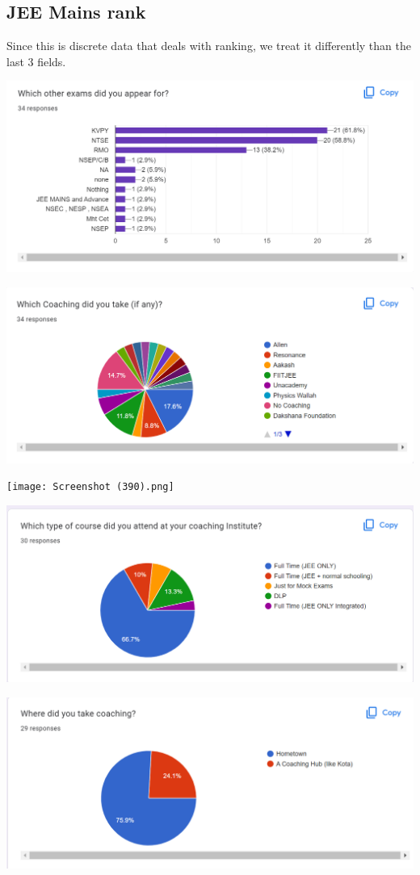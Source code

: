 \documentclass[
  letterpaper,
  DIV=11,
  numbers=noendperiod]{scrartcl}
\begin{document}
\hypertarget{jee-mains-rank}{%
\subsection{JEE Mains rank}\label{jee-mains-rank}}

Since this is discrete data that deals with ranking, we treat it
differently than the last 3 fields.

\includegraphics{Screenshot (381).png}

\includegraphics{Screenshot (382).png}

\texttt{[image: Screenshot (390).png]}

\includegraphics{Screenshot (383).png}

\includegraphics{Screenshot (384).png}
\end{document}

